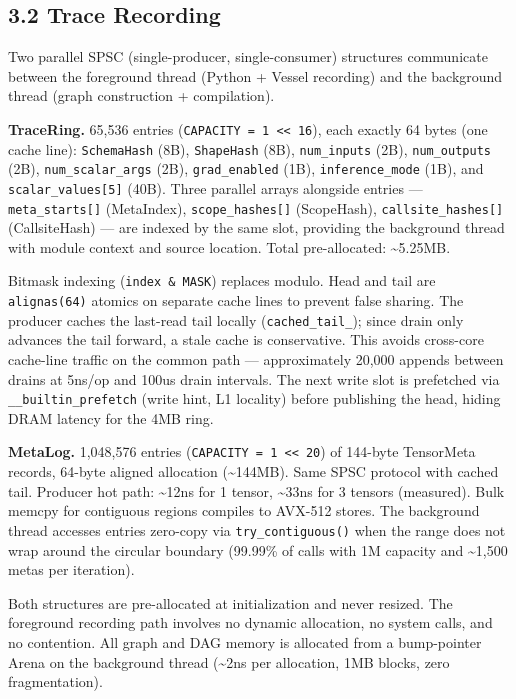 \subsection{3.2 Trace Recording}\label{trace-recording}

Two parallel SPSC (single-producer, single-consumer) structures communicate between the foreground thread (Python + Vessel recording) and the background thread (graph construction + compilation).

\textbf{TraceRing.} 65,536 entries (\texttt{CAPACITY\ =\ 1\ \textless{}\textless{}\ 16}), each exactly 64 bytes (one cache line): \texttt{SchemaHash} (8B), \texttt{ShapeHash} (8B), \texttt{num\_inputs} (2B), \texttt{num\_outputs} (2B), \texttt{num\_scalar\_args} (2B), \texttt{grad\_enabled} (1B), \texttt{inference\_mode} (1B), and \texttt{scalar\_values{[}5{]}} (40B). Three parallel arrays alongside entries --- \texttt{meta\_starts{[}{]}} (MetaIndex), \texttt{scope\_hashes{[}{]}} (ScopeHash), \texttt{callsite\_hashes{[}{]}} (CallsiteHash) --- are indexed by the same slot, providing the background thread with module context and source location. Total pre-allocated: \textasciitilde5.25MB.

Bitmask indexing (\texttt{index\ \&\ MASK}) replaces modulo. Head and tail are \texttt{alignas(64)} atomics on separate cache lines to prevent false sharing. The producer caches the last-read tail locally (\texttt{cached\_tail\_}); since drain only advances the tail forward, a stale cache is conservative. This avoids cross-core cache-line traffic on the common path --- approximately 20,000 appends between drains at 5ns/op and 100us drain intervals. The next write slot is prefetched via \texttt{\_\_builtin\_prefetch} (write hint, L1 locality) before publishing the head, hiding DRAM latency for the 4MB ring.

\textbf{MetaLog.} 1,048,576 entries (\texttt{CAPACITY\ =\ 1\ \textless{}\textless{}\ 20}) of 144-byte TensorMeta records, 64-byte aligned allocation (\textasciitilde144MB). Same SPSC protocol with cached tail. Producer hot path: \textasciitilde12ns for 1 tensor, \textasciitilde33ns for 3 tensors (measured). Bulk memcpy for contiguous regions compiles to AVX-512 stores. The background thread accesses entries zero-copy via \texttt{try\_contiguous()} when the range does not wrap around the circular boundary (99.99\% of calls with 1M capacity and \textasciitilde1,500 metas per iteration).

Both structures are pre-allocated at initialization and never resized. The foreground recording path involves no dynamic allocation, no system calls, and no contention. All graph and DAG memory is allocated from a bump-pointer Arena on the background thread (\textasciitilde2ns per allocation, 1MB blocks, zero fragmentation).

